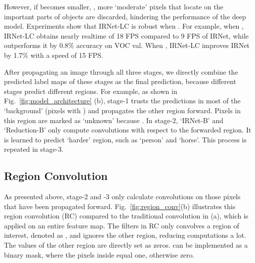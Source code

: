 \documentclass[10pt,twocolumn,letterpaper]{article}
\begin{document}
However, if  becomes smaller, \ie , more `moderate' pixels that locate on the important parts of objects are discarded, hindering the performance of the deep model.
Experiments show that IRNet-LC is robust when .
For example, when , IRNet-LC obtains nearly realtime of 18 FPS compared to 9 FPS of IRNet, while outperforms it by 0.8\% accuracy on VOC val.
When , IRNet-LC improves IRNet by 1.7\% with a speed of 15 FPS.



After propagating an image through all three stages, we directly combine the predicted label maps of these stages as the final prediction, because different stages predict different regions.
For example, as shown in Fig.~\ref{fig:model_architecture} (b), stage-1 trusts the predictions in most of the `background' (pixels with ) and propagates the other region forward.
Pixels in this region are marked as `unknown' because .
In stage-2, `IRNet-B' and `Reduction-B' only compute convolutions with respect to the forwarded region.
It is learned to predict `harder' region, such as `person' and `horse'.
This process is repeated in stage-3.
































\subsection{Region Convolution}
\label{subsec:region_conv}


As presented above, stage-2 and -3 only calculate convolutions on those pixels that have been propagated forward.
Fig.~\ref{fig:region_conv}(b) illustrates this region convolution (RC) compared to the traditional convolution in (a), which is applied on an entire feature map.
The filters in RC only convolves a region of interest, denoted as , and ignores the other region, reducing computations a lot. The values of the other region are directly set as zeros.
 can be implemented as a binary mask,
where the pixels inside  equal one, otherwise zero.
\end{document}
